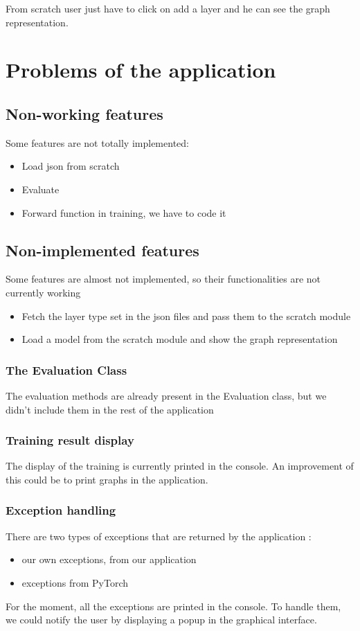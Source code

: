 From scratch user just have to click on add a layer and he can see the graph representation.

\section{Problems of the application}
\subsection{Non-working features}
Some features are not totally implemented:
\begin{itemize}
    \item Load json from scratch 
    \item Evaluate
    \item Forward function in training, we have to code it
\end{itemize}
\subsection{Non-implemented features}
Some features are almost not implemented, so their functionalities are not currently working
\begin{itemize}
    \item Fetch the layer type set in the json files and pass them to the scratch module
    \item Load a model from the scratch module and show the graph representation
\end{itemize}
\subsubsection{The Evaluation Class}
The evaluation methods are already present in the Evaluation class, but we didn't include them in the rest of the application

\subsubsection{Training result display}
The display of the training is currently printed in the console.
An improvement of this could be to print graphs in the application.
\subsubsection{Exception handling}
There are two types of exceptions that are returned by the application :
\begin{itemize}
    \item our own exceptions, from our application
    \item exceptions from PyTorch
\end{itemize}
For the moment, all the exceptions are printed in the console. To handle them, we could notify the user by displaying a popup in the graphical interface.

